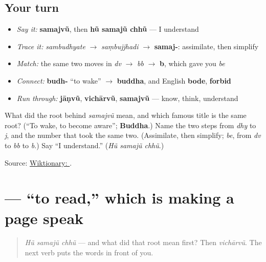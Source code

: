 \subsection*{Your turn}
\begin{itemize}
\raggedright
  \item \emph{Say it:} \textbf{samajvũ}, then \textbf{hũ samajũ chhũ} — I understand
  \item \emph{Trace it:} \emph{sambudhyate} $\to$ \emph{saṃbujjhadi} $\to$ \textbf{samaj-}: assimilate, then simplify
  \item \emph{Match:} the same two moves in \emph{dv} $\to$ \emph{bb} $\to$ \textbf{b}, which gave you \emph{be}
  \item \emph{Connect:} \textbf{budh-} \textquotedblleft{}to wake\textquotedblright{} $\to$ \textbf{buddha}, and English \textbf{bode}, \textbf{forbid}
  \item \emph{Run through:} \textbf{jāṇvũ}, \textbf{vichārvũ}, \textbf{samajvũ} — know, think, understand
\end{itemize}

\begin{tcolorbox}[breakable,colback=teal!4,colframe=teal!35!black,title={Before you move on}]
What did the root behind \emph{samajvũ} mean, and which famous title is the same root? (\textquotedblleft{}To wake, to become aware\textquotedblright{}; \textbf{Buddha}.) Name the two steps from \emph{dhy} to \emph{j}, and the number that took the same two. (Assimilate, then simplify; \emph{be}, from \emph{dv} to \emph{bb} to \emph{b}.) Say \textquotedblleft{}I understand.\textquotedblright{} (\emph{Hũ samajũ chhũ}.)

Source: \href{https://en.wiktionary.org/wiki/\%E0\%AA\%B8\%E0\%AA\%AE\%E0\%AA\%9C\%E0\%AA\%B5\%E0\%AB\%81\%E0\%AA\%82}{Wiktionary: }.
\end{tcolorbox}
\section[vā̃chvũ]{ — \textquotedblleft{}to read,\textquotedblright{} which is making a page speak}

\label{lesson:GU-C08-vanchvun}



\begin{quote}
\emph{Hũ samajũ chhũ} — and what did that root mean first? Then \emph{vichārvũ}. The next verb puts the words in front of you.
\end{quote}

